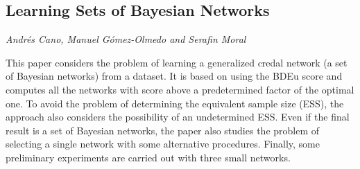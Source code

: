 \documentclass[../booklet.tex]{subfiles}
\begin{document}
\subsection[Learning Sets of Bayesian Networks. {\it Andrés Cano, Manuel Gómez-Olmedo and Serafin Moral}]{Learning Sets of Bayesian Networks}
  

\begin{center}
  {\it Andrés Cano, Manuel Gómez-Olmedo and Serafin Moral}
\end{center}



This paper considers the problem of learning a  generalized credal network (a set of Bayesian networks) from a dataset. It is based on using the BDEu score and computes all the networks with score above a predetermined factor of the optimal one. To avoid the problem of determining the equivalent sample size (ESS), the approach also considers the possibility of an undetermined ESS. Even if the final result is a set of Bayesian networks, the paper also studies the problem of selecting a single network with some alternative procedures. Finally, some preliminary experiments are carried out with three small networks. 

\end{document}
